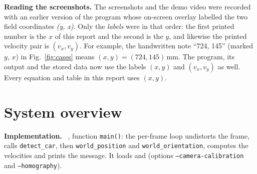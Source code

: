\documentclass[10pt,a4paper]{article}
\newenvironment{impl}{\par\smallskip\noindent\footnotesize\textbf{Implementation.}\ }{\par\smallskip}
\begin{document}
\textbf{Reading the screenshots.}  The screenshots and the demo video were
recorded with an earlier version of the program whose on-screen overlay
labelled the two field coordinates \emph{(y, x)}.  Only the \emph{labels} were
in that order: the first printed number is the $x$ of this report and the
second is the $y$, and likewise the printed velocity pair is $(v_x,v_y)$.  For
example, the handwritten note ``724, 145'' (marked $y$, $x$) in
Fig.~\ref{fig:cases} means $(x,y)=(724,145)$\,mm.  The program, its output
and the stored data now use the labels $(x,y)$ and $(v_x,v_y)$ as well.  Every
equation and table in this report uses $(x,y)$.

\section{System overview}

\begin{impl}
, function \texttt{main()}: the per-frame loop
undistorts the frame, calls \texttt{detect\_car}, then \texttt{world\_position}
and \texttt{world\_orientation}, computes the velocities and prints the message.
It loads  and
 (options \texttt{--camera-calibration}
and \texttt{--homography}).
\end{impl}

\begin{center}
\end{center}
\end{document}
